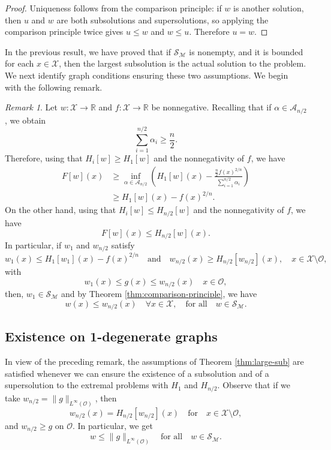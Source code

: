 \documentclass[reqno,11pt]{amsart}
\numberwithin{equation}{section}
\theoremstyle{definition}
\theoremstyle{remark}
\newtheorem{remark}[theorem]{Remark}
\begin{document}
\begin{proof}
Uniqueness follows from the comparison principle: if \(w\) is another solution, then \(u\) and \(w\) are both subsolutions and supersolutions, so applying the comparison principle twice gives \(u\le w\) and \(w\le u\). Therefore \(u=w\).
\end{proof}

In the previous result, we have proved that if $\mathcal{S}_{\mathcal{M}}$ is nonempty, and it is bounded for each $x \in \mathcal{X}$, then the largest subsolution is the actual solution to the problem. We next identify graph conditions ensuring these two assumptions. We begin with the following remark.

\begin{remark}
Let $w\colon \mathcal{X} \to \mathbb{R}$ and $f\colon \mathcal{X} \to \mathbb{R}$ be nonnegative. Recalling that if $\alpha \in \mathcal{A}_{n/2}$, we obtain
\[
    \sum_{i=1}^{n/2}\alpha_i \geq \frac{n}{2}.
\]
Therefore, using that $H_i[w] \geq H_1[w]$ and the nonnegativity of $f$, we have
\begin{align*}
    F[w](x) & \geq \inf_{\alpha\in\mathcal{A}_{n/2}}\left(H_1[w](x) - \frac{\frac{n}{2}f(x)^{2/n}}{\sum_{i=1}^{n/2}\alpha_i}\right)\\
        &\geq  H_1[w](x)-f(x)^{2/n}.
\end{align*}
On the other hand, using that $H_i[w] \leq H_{n/2}[w]$ and the nonnegativity of $f$, we have
\[
    F[w](x)  \leq H_{n/2}[w](x).
\]
In particular, if $w_1$ and $w_{n/2}$ satisfy
\[
w_1 (x) \leq H_{1}[w_1](x)-f(x)^{2/n} \quad \text{and} \quad w_{n/2} (x) \geq H_{n/2}[w_{n/2}] (x), \quad x\in \mathcal{X}\setminus\mathcal{O},
\]
with $$w_1 (x) \leq g (x) \leq w_{n/2} (x) \quad x \in  \mathcal{O},$$ then, $w_1 \in \mathcal{S}_{\mathcal{M}}$ and by Theorem \ref{thm:comparison-principle}, we have
\[
     w (x) \leq w_{n/2} (x) \quad \forall x \in \mathcal{X}, \quad \text{for all} \quad w \in \mathcal{S}_{\mathcal{M}}.
\]
\end{remark}

\subsection{Existence on 1-degenerate graphs}

In view of the preceding remark, the assumptions of Theorem \ref{thm:large-sub} are satisfied whenever we can ensure the existence of a subsolution and of a supersolution to the extremal problems with $H_1$ and $H_{n/2}$. Observe that if we take $w_{n/2} = \|g\|_{L^\infty(\mathcal{O})}$, then
\[
    w_{n/2}(x) = H_{n/2} [w_{n/2}](x) \quad \text{for} \quad x \in \mathcal{X} \setminus \mathcal{O},
\]
and $w_{n/2} \geq g$ on $\mathcal{O}$. In particular, we get
\[
    w \leq \|g\|_{L^\infty(\mathcal{O})} \quad \text{for all} \quad w \in \mathcal{S}_{\mathcal{M}}.
\]
\end{document}
